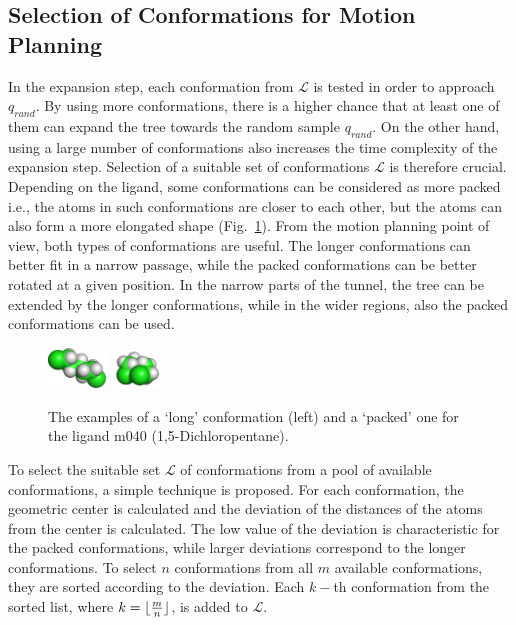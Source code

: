 \documentclass[usletter, 10pt, conference]{ieeeconf} %
\def\qrand{q_{rand}}
\def\L{\mathcal{L}}
\begin{document}
\subsection{Selection of Conformations for Motion Planning}
\label{sec::strat}

In the expansion step, each conformation from $\L$ is tested in order to approach $\qrand$.
By using more conformations, there is a higher chance that at least one of them can expand the tree towards the random sample $\qrand$.
On the other hand, using a large number of conformations also increases the time complexity of the expansion step.
Selection of a suitable set of conformations $\L$ is therefore crucial.
Depending on the ligand, some conformations can be considered as more packed i.e., the atoms in such conformations are closer to each other, but 
the atoms can also form a more elongated shape (Fig.~\ref{fig::m040c}).
From the motion planning point of view, both types of conformations are useful.
The longer conformations can better fit in a narrow passage, while the packed conformations can be better rotated at a given position.
In the narrow parts of the tunnel, the tree can be extended by the longer conformations, while in the wider regions, also the
packed conformations can be used.
\vspace{-3mm}
	
\begin{figure}[hb]
\centering
\includegraphics[width=0.14\textwidth]{fig/m040-conf1} \hskip 25pt
\includegraphics[width=0.11\textwidth]{fig/m040-conf2}
\caption{\label{fig::m040c}
 The examples of a `long' conformation (left) and a `packed' one for the ligand m040 (1,5-Dichloropentane).
}
\end{figure}


To select the suitable set $\L$ of conformations from a pool of available conformations, a simple technique is proposed.  
For each conformation, the geometric center is calculated and the deviation of the distances of the atoms from the center is calculated.
The low value of the deviation is characteristic for the packed conformations, while larger deviations correspond to the longer conformations.
To select $n$ conformations from all $m$ available conformations, they are sorted according to the deviation.
Each $k-$th conformation from the sorted list, where $k=\lfloor{m\over n}\rfloor$, is added to $\L$.
\end{document}
